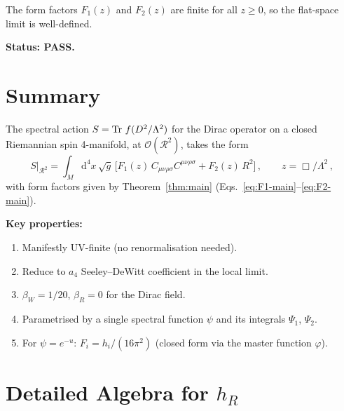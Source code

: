 \documentclass[11pt,a4paper]{article}
\newcommand{\Weylsq}{C_{\mu\nu\rho\sigma}C^{\mu\nu\rho\sigma}}
\renewcommand{\dd}{\mathrm{d}}
\theoremstyle{definition}
\theoremstyle{remark}
\begin{document}
The form factors $F_1(z)$ and $F_2(z)$ are finite for all
$z \geq 0$, so the flat-space limit is well-defined.

\textbf{Status: PASS.}


\newpage
\section{Summary}
\label{sec:summary}

\begin{tcolorbox}[colback=blue!5!white, colframe=blue!75!black,
  title=\textbf{Main Result: SCT Nonlocal Form Factors}]

The spectral action $S = \Tr\,f(D^2/\Lambda^2)$ for the Dirac operator
on a closed Riemannian spin 4-manifold, at
$\mathcal{O}(\mathcal{R}^2)$, takes the form
\begin{equation*}
  S\Big|_{\mathcal{R}^2}
  = \int_M \dd^4x\,\sqrt{g}\,\bigl[
    F_1(z)\,\Weylsq + F_2(z)\,R^2\bigr]\,,
  \qquad z = \Box/\Lambda^2\,,
\end{equation*}
with form factors given by Theorem~\ref{thm:main}
(Eqs.~\eqref{eq:F1-main}--\eqref{eq:F2-main}).

\medskip
\textbf{Key properties:}
\begin{enumerate}
\item Manifestly UV-finite (no renormalisation needed).
\item Reduce to $a_4$ Seeley--DeWitt coefficient in the local limit.
\item $\beta_W = 1/20$, $\beta_R = 0$ for the Dirac field.
\item Parametrised by a single spectral function $\psi$ and its
  integrals $\Psi_1$, $\Psi_2$.
\item For $\psi = e^{-u}$: $F_i = h_i/(16\pi^2)$ (closed form
  via the master function $\varphi$).
\end{enumerate}
\end{tcolorbox}


\appendix
\newpage
\section{Detailed Algebra for $h_R$}
\label{app:hR-algebra}
\end{document}
